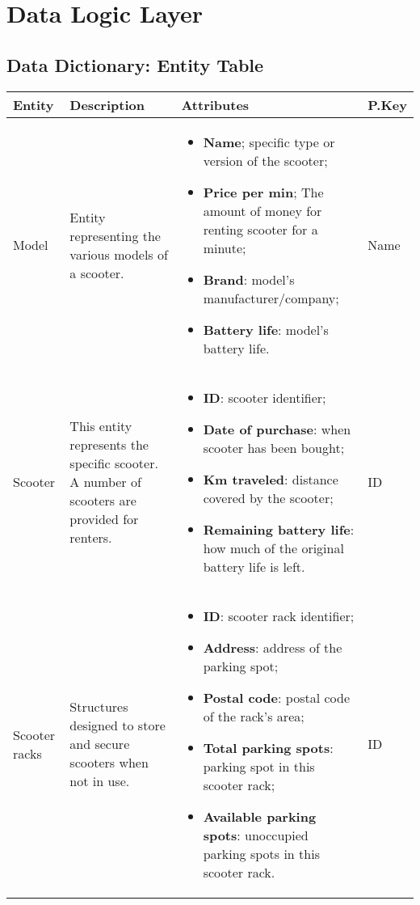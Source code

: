 \section{Data Logic Layer}



\subsection{Data Dictionary: Entity Table}

\begin{longtable}{|p{}|p{} |p{}|p{} |} 
\hline
\textbf{Entity} & \textbf{Description} & \textbf{Attributes} & \textbf{P.Key}  \\\hline

Model & Entity representing the various models of a scooter. & 
\begin{itemize}
    \vspace{-1em}
    \item \textbf{Name}; specific type or version of the scooter;
    \item \textbf{Price per min}; The amount of money for renting scooter for a minute;
    \item \textbf{Brand}: model's manufacturer/company;
    \item \textbf{Battery life}: model's battery life.
\end{itemize} & Name \\\hline                 

Scooter &  This entity represents the specific scooter. A number of scooters are provided for renters. & 
\begin{itemize}
    \vspace{-1em}
    \item \textbf{ID}: scooter identifier; 
    \item \textbf{Date of purchase}: when scooter has been bought;
    \item \textbf{Km traveled}: distance covered by the scooter;
    \item \textbf{Remaining battery life}: how much of the original battery life is left.
\end{itemize} & ID \\\hline

Scooter racks & Structures designed to store and secure scooters when not in use. & 
\begin{itemize}
    \vspace{-1em}
    \item \textbf{ID}: scooter rack identifier;
    \item \textbf{Address}: address of the parking spot;
    \item \textbf{Postal code}: postal code of the rack's area; 
    \item \textbf{Total parking spots}: parking spot in this scooter rack; 
    \item \textbf{Available parking spots}: unoccupied parking spots in this scooter rack. 
 \end{itemize} & ID \\\hline



\end{longtable}
